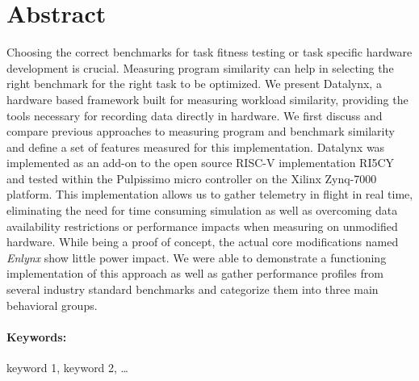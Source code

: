 \documentclass[bachelor_paper.tex]{subfiles}
\begin{document}
\section*{Abstract}\thispagestyle{empty}
    \label{chap:abstract}

    Choosing the correct benchmarks for task fitness testing or task specific hardware development is crucial. Measuring program similarity can help in selecting the right benchmark for the right task to be optimized. We present Datalynx, a hardware based framework built for measuring workload similarity, providing the tools necessary for recording data directly in hardware. We first discuss and compare previous approaches to measuring program and benchmark similarity and define a set of features measured for this implementation. Datalynx was implemented as an add-on to the open source RISC-V implementation RI5CY and tested within the Pulpissimo micro controller on the Xilinx Zynq-7000 platform. This implementation allows us to gather telemetry in flight in real time, eliminating the need for time consuming simulation as well as overcoming data availability restrictions or performance impacts when measuring on unmodified hardware. While being a proof of concept, the actual core modifications named \emph{Enlynx} show little power impact. We were able to demonstrate a functioning implementation of this approach as well as gather performance profiles from several industry standard benchmarks and categorize them into three main behavioral groups.
    
    \vfill
\paragraph*{Keywords:} keyword 1, keyword 2, \dots

\isstandalone



\fi
\end{document}
